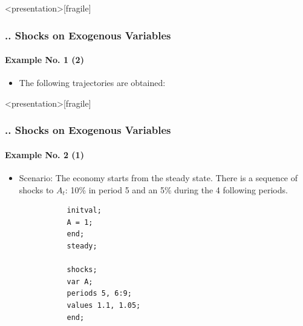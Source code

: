 \documentclass[11pt,aspectratio=169]{beamer}
\begin{document}
\begin{frame}<presentation>[fragile]
	\frametitle{{\thesection.\thesubsection.\thesubsubsection} Shocks on Exogenous Variables}
	\framesubtitle{Example No. 1 (2)}
	\begin{itemize}
		\item The following trajectories are obtained:
		\begin{figure}
			\centering
			\qquad
			\qquad
		\end{figure}
	\end{itemize}
\end{frame}
\begin{frame}<presentation>[fragile]
	\frametitle{{\thesection.\thesubsection.\thesubsubsection} Shocks on Exogenous Variables}
	\framesubtitle{Example No. 2 (1)}
	\begin{itemize}
		\item Scenario: The economy starts from the steady state. There is a sequence of shocks to $A_t$: 10\% in period 5 and an 5\% during the 4 following periods.
		\begin{verbatim}
		   initval;
		   A = 1;
		   end;
		   steady;
		
		   shocks;
		   var A;
		   periods 5, 6:9;
		   values 1.1, 1.05;
		   end;
		\end{verbatim}
	\end{itemize}
\end{frame}
\end{document}
